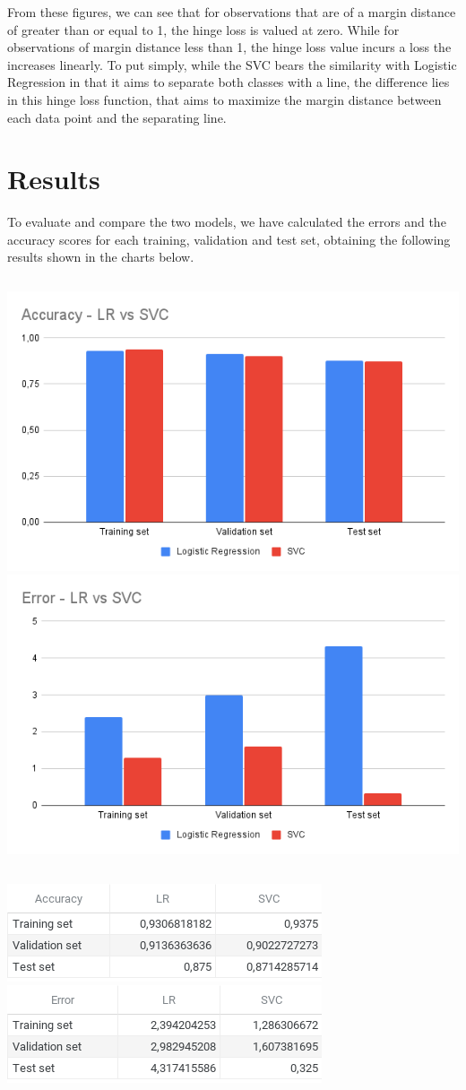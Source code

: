 \documentclass[a4paper,12pt]{article}
\begin{document}
From these figures, we can see that for observations that are of a margin distance of greater than or equal to 1, the hinge loss is valued at zero. While for observations of margin distance less than 1, the hinge loss value incurs a loss the increases linearly. To put simply, while the SVC bears the similarity with Logistic Regression in that it aims to separate both classes with a line, the difference lies in this hinge loss function, that aims to maximize the margin distance between each data point and the separating line.

\section{Results}
\label{sec:org93c249e}

To evaluate and compare the two models, we have calculated the errors and the accuracy scores for each training, validation and test set, obtaining the following results shown in the charts below.
\begin{center}
\begin{tabular}{l}
\\
\end{tabular}
\end{center}
\includegraphics[height=0.3\textwidth]{./graphs/accuracy_chart.png}
\includegraphics[height=0.3\textwidth]{./graphs/error_chart.png}
\begin{center}
\begin{tabular}{l}
\\
\end{tabular}
\end{center}
\includegraphics[height=0.15\textwidth]{./graphs/accuracy_table.png}
\includegraphics[height=0.15\textwidth]{./graphs/error_table.png}
\end{document}
